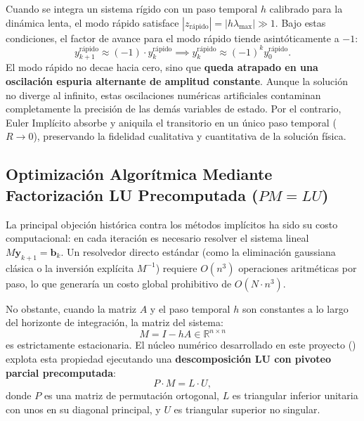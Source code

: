 \documentclass[11pt,a4paper]{article}
\begin{document}
Cuando se integra un sistema rígido con un paso temporal $h$ calibrado para la dinámica lenta, el modo rápido satisface $|z_{\text{rápido}}| = |h\lambda_{\max}| \gg 1$. Bajo estas condiciones, el factor de avance para el modo rápido tiende asintóticamente a $-1$:
\begin{equation}
    y_{k+1}^{\text{rápido}} \approx (-1) \cdot y_k^{\text{rápido}} \implies y_k^{\text{rápido}} \approx (-1)^k y_0^{\text{rápido}}.
\end{equation}
El modo rápido no decae hacia cero, sino que \textbf{queda atrapado en una oscilación espuria alternante de amplitud constante}. Aunque la solución no diverge al infinito, estas oscilaciones numéricas artificiales contaminan completamente la precisión de las demás variables de estado. Por el contrario, Euler Implícito absorbe y aniquila el transitorio en un único paso temporal ($R \to 0$), preservando la fidelidad cualitativa y cuantitativa de la solución física.

\subsection{Optimización Algorítmica Mediante Factorización LU Precomputada \texorpdfstring{($PM = LU$)}{(PM = LU)}}
La principal objeción histórica contra los métodos implícitos ha sido su costo computacional: en cada iteración es necesario resolver el sistema lineal $M\mathbf{y}_{k+1} = \mathbf{b}_k$. Un resolvedor directo estándar (como la eliminación gaussiana clásica o la inversión explícita $M^{-1}$) requiere $O(n^3)$ operaciones aritméticas por paso, lo que generaría un costo global prohibitivo de $O(N \cdot n^3)$.

No obstante, cuando la matriz $A$ y el paso temporal $h$ son constantes a lo largo del horizonte de integración, la matriz del sistema:
\begin{equation}
    M = I - hA \in \mathbb{R}^{n \times n}
\end{equation}
es estrictamente estacionaria. El núcleo numérico desarrollado en este proyecto () explota esta propiedad ejecutando una \textbf{descomposición LU con pivoteo parcial precomputada}:
\begin{equation}
    P \cdot M = L \cdot U,
\end{equation}
donde $P$ es una matriz de permutación ortogonal, $L$ es triangular inferior unitaria con unos en su diagonal principal, y $U$ es triangular superior no singular.
\end{document}
